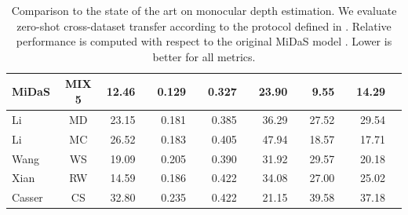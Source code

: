 \documentclass[10pt,twocolumn,letterpaper]{article}
\begin{document}
\begin{table}[t!]
{\begin{tabular}{@{}l@{\hspace{0mm}}c@{\hspace{3mm}}|@{\hspace{3mm}}d{2.2}l@{\hspace{3.0mm}}d{1.3}c@{\hspace{3.0mm}}d{1.3}c@{\hspace{3.0mm}}d{2.2}c@{\hspace{3.0mm}}d{2.2}c@{\hspace{3.0mm}}d{2.2}c@{}}
                \hline
                MiDaS   \cite{Ranftl2020} & \small {MIX 5}                  & 12.46           &               & 0.129           &                             & 0.327                       &               & 23.90           &               & 9.55          &               & 14.29          &               \\
                \hline
                Li  \cite{LiSnavely2018}  & \small MD  \cite{LiSnavely2018} & 23.15           &               & 0.181           &                             & 0.385                       &               & 36.29           &               & 27.52         &               & 29.54          &               \\
                Li \cite{Li2019}          & \small MC  \cite{Li2019}        & 26.52           &               & 0.183           &                             & 0.405                       &               & 47.94           &               & 18.57         &               & 17.71          &               \\
                Wang \cite{Wang2019}      & \small WS   \cite{Wang2019}     & 19.09           &               & 0.205           &                             & 0.390                       &               & 31.92           &               & 29.57         &               & 20.18          &               \\
                Xian  \cite{Xian2018}     & \small RW   \cite{Xian2018}     & 14.59           &               & 0.186           &                             & 0.422                       &               & 34.08           &               & 27.00         &               & 25.02          &               \\
                Casser \cite{Casser2019}  & \small CS   \cite{Cordts2016}   & 32.80           &               & 0.235           &                             & 0.422                       &               & 21.15           &               & 39.58         &               & 37.18          &               \\
                \bottomrule
              \end{tabular}
            } \vspace{1.5mm}
            \caption{Comparison to the state of the art on monocular depth
              estimation. We evaluate zero-shot cross-dataset transfer according
              to the protocol defined in \cite{Ranftl2020}. Relative performance is computed with respect to the original MiDaS model
              \cite{Ranftl2020}. Lower is better for all metrics.}
            \label{tab:mono_sota}
          \end{table}
\end{document}
